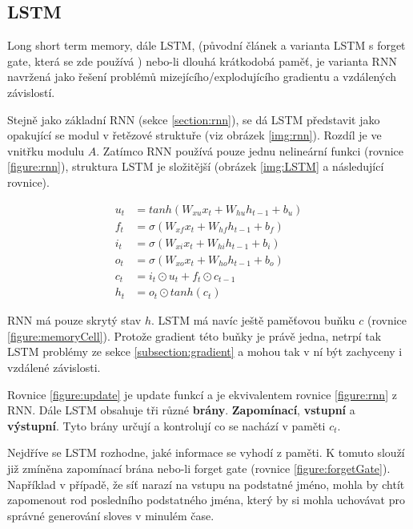 \subsection{LSTM}\label{section:LSTM}
Long short term memory, dále LSTM, (původní článek \cite{LSTM} a varianta LSTM s forget gate, která se zde používá \cite{forgetLSTM}) nebo-li dlouhá krátkodobá paměť, je varianta RNN navržená jako řešení problémů mizejícího/explodujícího gradientu a vzdálených závislostí.

Stejně jako základní RNN (sekce \ref{section:rnn}), se dá LSTM představit jako opakující se modul v řetězové struktuře (viz obrázek \ref{img:rnn}). Rozdíl je ve vnitřku modulu $A$. Zatímco RNN používá pouze jednu nelineární funkci (rovnice \ref{figure:rnn}), struktura LSTM je složitější (obrázek \ref{img:LSTM} a následující rovnice).

\begin{align}
    u_{t}&=tanh(W_{xu}x_t + W_{hu}h_{t-1} + b_u) \label{figure:update} \\
    f_{t}&=\sigma(W_{xf}x_{t}+W_{hf}h_{t-1}+b_{f}) \label{figure:forgetGate} \\
    i_{t}&=\sigma(W_{xi}x_{t}+W_{hi}h_{t-1}+b_{i}) \label{figure:inputGate} \\
    o_{t}&=\sigma(W_{xo}x_{t}+W_{ho}h_{t-1}+b_{o}) \label{figure:outputGate} \\
    c_{t}&=i_{t}\odot u_{t}+f_{t}\odot c_{t-1}\label{figure:memoryCell} \\
    h_{t}&=o_{t}\odot tanh(c_{t}) \label{figure:hiddenState}
\end{align}

RNN má pouze skrytý stav $h$. LSTM má navíc ještě paměťovou buňku $c$ (rovnice \ref{figure:memoryCell}). Protože gradient této buňky je právě jedna, netrpí tak LSTM problémy ze sekce \ref{subsection:gradient} a mohou tak v ní být zachyceny i vzdálené závislosti.

Rovnice \ref{figure:update} je update funkcí a je ekvivalentem rovnice \ref{figure:rnn} z RNN.
Dále LSTM obsahuje tři různé \textbf{brány}. \textbf{Zapomínací}, \textbf{vstupní} a \textbf{výstupní}. Tyto brány určují a kontrolují co se nachází v paměti $c_t$.

Nejdříve se LSTM rozhodne, jaké informace se vyhodí z paměti. K tomuto slouží již zmíněna zapomínací brána nebo-li forget gate (rovnice \ref{figure:forgetGate}). Například v případě, že síť narazí na vstupu na podstatné jméno, mohla by chtít zapomenout rod posledního podstatného jména, který by si mohla uchovávat pro správné generování sloves v minulém čase.

